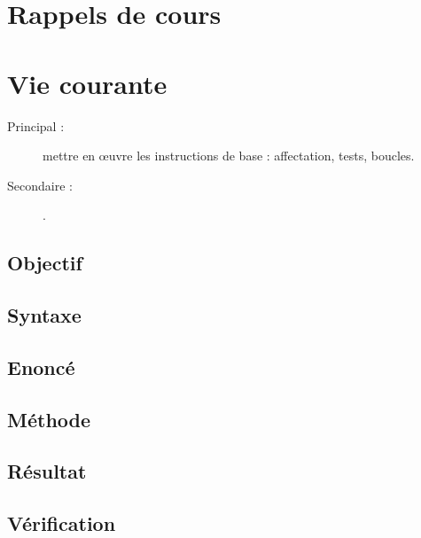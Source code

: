 
\section{Rappels de cours}\label{instructions:cours}

\section{Vie courante}\label{instructions:vie-courante}
\begin{description}
\item[Principal : ] mettre en \oe uvre les instructions de base : affectation, tests, boucles.
\item[Secondaire :] .
\end{description}

\subsection{Objectif}\label{instructions:vie-courante:objectif}

\subsection{Syntaxe \python}\label{instructions:vie-courante:python}

\subsection{Enoncé}\label{instructions:vie-courante:enonce}

\subsection{Méthode}\label{instructions:vie-courante:methode}

\subsection{Résultat}\label{instructions:vie-courante:resultat}

\subsection{Vérification}\label{instructions:vie-courante:verification}

